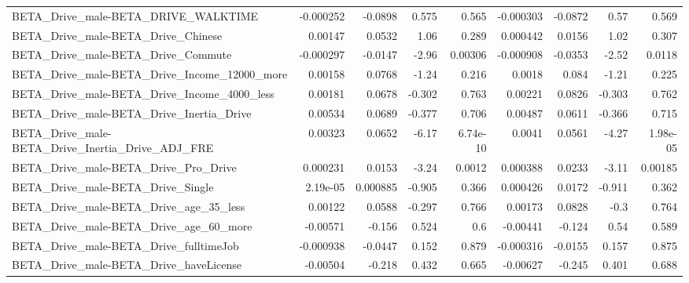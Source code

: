 \begin{tabular}{lrrrrrrrr}
BETA\_Drive\_male-BETA\_DRIVE\_WALKTIME                &   -0.000252 &      -0.0898 &    0.575 &    0.565 &  -0.000303 &     -0.0872 &         0.57 &         0.569 \\
BETA\_Drive\_male-BETA\_Drive\_Chinese                 &     0.00147 &       0.0532 &     1.06 &    0.289 &   0.000442 &      0.0156 &         1.02 &         0.307 \\
BETA\_Drive\_male-BETA\_Drive\_Commute                 &   -0.000297 &      -0.0147 &    -2.96 &  0.00306 &  -0.000908 &     -0.0353 &        -2.52 &        0.0118 \\
BETA\_Drive\_male-BETA\_Drive\_Income\_12000\_more       &     0.00158 &       0.0768 &    -1.24 &    0.216 &     0.0018 &       0.084 &        -1.21 &         0.225 \\
BETA\_Drive\_male-BETA\_Drive\_Income\_4000\_less        &     0.00181 &       0.0678 &   -0.302 &    0.763 &    0.00221 &      0.0826 &       -0.303 &         0.762 \\
BETA\_Drive\_male-BETA\_Drive\_Inertia\_Drive           &     0.00534 &       0.0689 &   -0.377 &    0.706 &    0.00487 &      0.0611 &       -0.366 &         0.715 \\
BETA\_Drive\_male-BETA\_Drive\_Inertia\_Drive\_ADJ\_FRE   &     0.00323 &       0.0652 &    -6.17 & 6.74e-10 &     0.0041 &      0.0561 &        -4.27 &      1.98e-05 \\
BETA\_Drive\_male-BETA\_Drive\_Pro\_Drive               &    0.000231 &       0.0153 &    -3.24 &   0.0012 &   0.000388 &      0.0233 &        -3.11 &       0.00185 \\
BETA\_Drive\_male-BETA\_Drive\_Single                  &    2.19e-05 &     0.000885 &   -0.905 &    0.366 &   0.000426 &      0.0172 &       -0.911 &         0.362 \\
BETA\_Drive\_male-BETA\_Drive\_age\_35\_less             &     0.00122 &       0.0588 &   -0.297 &    0.766 &    0.00173 &      0.0828 &         -0.3 &         0.764 \\
BETA\_Drive\_male-BETA\_Drive\_age\_60\_more             &    -0.00571 &       -0.156 &    0.524 &      0.6 &   -0.00441 &      -0.124 &         0.54 &         0.589 \\
BETA\_Drive\_male-BETA\_Drive\_fulltimeJob             &   -0.000938 &      -0.0447 &    0.152 &    0.879 &  -0.000316 &     -0.0155 &        0.157 &         0.875 \\
BETA\_Drive\_male-BETA\_Drive\_haveLicense             &    -0.00504 &       -0.218 &    0.432 &    0.665 &   -0.00627 &      -0.245 &        0.401 &         0.688 \\

\end{tabular}
